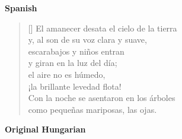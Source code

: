\documentclass[a4paper,12pt,twoside,final]{book}
\begin{document}
\newpage


\noindent \textbf{Spanish}


\settowidth{\versewidth}{Con la noche se asentaron en los árboles}

\begin{verse}[\versewidth]
  El amanecer desata el cielo de la tierra \\
  y, al son de su voz clara y suave, \\
  escarabajos y niños entran \\
  y giran en la luz del día; \\
  el aire no es húmedo, \\
  ¡la brillante levedad flota! \\
  Con la noche se asentaron en los árboles \\
  como pequeñas mariposas, las ojas. \\
\end{verse}


\noindent \textbf{Original Hungarian}



\settowidth{\versewidth}{a hajnal s tiszta, lágy szavára}
\end{document}
